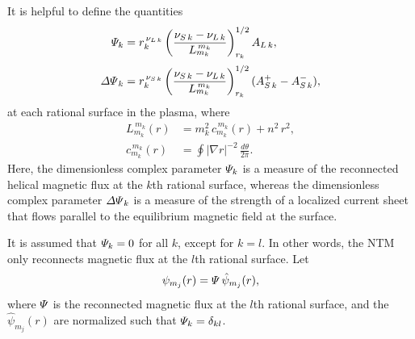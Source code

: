 \documentclass{iopjournal}
\begin{document}
{It is helpful to define the quantities \cite{tear9}
\begin{align}\label{Psidef}
{\mit\Psi}_k&= r_k^{\,\nu_{L\,k}}\left(\frac{\nu_{S\,k}-\nu_{L\,k}}{L_{m_k}^{\,{m_k}}}\right)^{1/2}_{r_k} A_{L\,k},\\[0.5ex]
{\mit\Delta\Psi}_k &= r_k^{\,\nu_{S\,k}}\left(\frac{\nu_{S\,k}-\nu_{L\,k}}{L_{m_k}^{\,m_k}}\right)^{1/2}_{r_k} (A_{S\,k}^+-A_{S\,k}^-),\label{edpp}
\end{align}
at each rational surface in the plasma, where
\begin{align}
L_{m_k}^{\,m_k}(r) &= m_k^2\,c_{m_k}^{\,m_k}(r) + n^2\,r^2,\\[0.5ex]
c_{m_k}^{\,m_k}(r) &=\oint|\nabla r|^{-2}\,\frac{d\theta}{2\pi}.
\end{align}
 Here, the dimensionless complex parameter ${\mit\Psi}_k$ is a measure of the reconnected helical magnetic flux at the $k$th rational surface, whereas
the dimensionless complex parameter ${\mit\Delta\Psi}_k$ is a measure of the strength of a localized current sheet that flows parallel to the equilibrium magnetic field at the surface.

 It is assumed that ${\mit\Psi}_k = 0$ for all $k$, except for $k=l$. In other words, the NTM only reconnects magnetic flux at the
$l$th rational surface. Let 
\begin{equation}
\psi_{m_j}(r) = {\mit\Psi}\,\hat{\psi}_{m_j}(r),
\end{equation}
where ${\mit\Psi}$ is the reconnected magnetic flux at the $l$th rational surface, and the $\hat{\psi}_{m_j}(r)$ are normalized such that ${\mit\Psi}_k
= \delta_{kl}$. 

}
\end{document}
